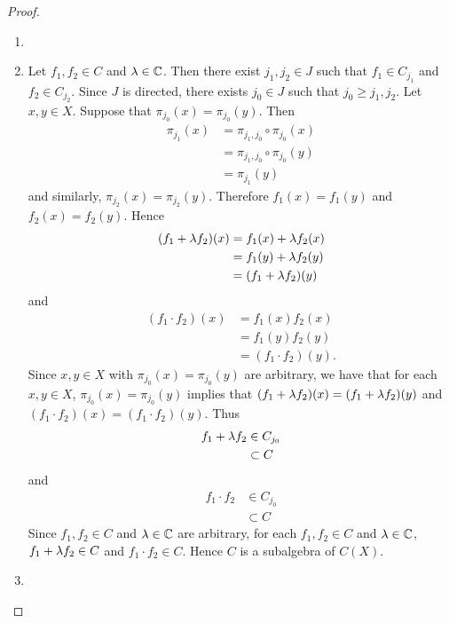 \documentclass{book}
\begin{document}
\begin{proof}
	\begin{enumerate}
		\item 
		\item Let $f_1 , f_2 \in C$ and $\lambda \in \mathbb{C}$. Then there exist $j_1, j_2 \in J$ such that $f_1 \in C_{j_1}$ and $f_2 \in C_{j_2}$. Since $J$ is directed, there exists $j_0 \in J$ such that $j_0 \geq j_1, j_2$. Let $x,y \in X$. Suppose that $\pi_{j_0}(x) = \pi_{j_0}(y)$. Then 
		\begin{align*}
			\pi_{j_1}(x)
			& = \pi_{j_1, j_0} \circ \pi_{j_0}(x) \\
			& =  \pi_{j_1, j_0} \circ \pi_{j_0}(y) \\
			& = \pi_{j_1}(y)
		\end{align*}
		and similarly, $\pi_{j_2}(x) = \pi_{j_2}(y)$. Therefore $f_1(x) = f_1(y)$ and $f_{2}(x) = f_2(y)$. Hence 
		\begin{align*}
			(f_1 + \lambda f_2)(x)
			& = f_1(x) + \lambda f_2(x) \\
			& = f_1(y) + \lambda f_2(y) \\
			& = (f_1 + \lambda f_2)(y)
		\end{align*}
		and 
		\begin{align*}
			(f_1 \cdot f_2)(x)
			& = f_1(x)f_2(x) \\
			& = f_1(y)f_2(y) \\
			& = (f_1 \cdot f_2) (y).
		\end{align*}
		Since $x, y \in X$ with $\pi_{j_0}(x) = \pi_{j_0}(y)$ are arbitrary, we have that for each $x,y \in X$, $\pi_{j_0}(x) = \pi_{j_0}(y)$ implies that $(f_1 + \lambda f_2)(x) = (f_1 + \lambda f_2)(y)$ and $(f_1 \cdot f_2)(x) = (f_1 \cdot f_2)(y)$. Thus 
		\begin{align*}
			f_1 + \lambda f_2 
			& \in C_{j_0} \\
			& \subset C
		\end{align*} 
		and 
		\begin{align*}
			f_1 \cdot f_2
			& \in C_{j_0} \\
			& \subset C
		\end{align*} 
		Since $f_1 , f_2 \in C$ and $\lambda \in \mathbb{C}$ are arbitrary, for each $f_1 , f_2 \in C$ and $\lambda \in \mathbb{C}$, $f_1 + \lambda f_2 \in C$ and $f_1 \cdot f_2 \in C$. Hence $C$ is a subalgebra of $C(X)$. 
		\item 
	\end{enumerate}
\end{proof}
	
	
	
\end{document}
